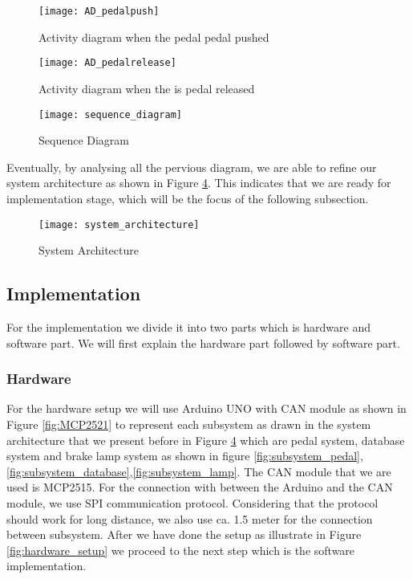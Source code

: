 \begin{figure}[h]
    \centering
    \texttt{[image: AD\_pedalpush]}
    \caption{Activity diagram when the pedal pedal pushed}
    \label{fig:fig:AD_pedalpush}
\end{figure}
\begin{figure}[h]
    \centering
    \texttt{[image: AD\_pedalrelease]}
    \caption{Activity diagram when the is pedal released}
    \label{fig:AD_pedalrelease}
\end{figure}


\begin{figure}[h]
    \centering
    \texttt{[image: sequence\_diagram]}
    \caption{Sequence Diagram}
    \label{fig:sequence_diagram}
\end{figure}

Eventually, by analysing all the pervious diagram,  we are able to refine our system architecture as shown in Figure \ref{fig:system_architecture}.  This indicates that we are ready for implementation stage, which will be the focus of the following subsection.

\begin{figure}[h]
    \centering
    \texttt{[image: system\_architecture]}
    \caption{System Architecture}
    \label{fig:system_architecture}
\end{figure}

\subsection{Implementation}
For the implementation we divide it into two parts which is hardware and software part. We will first explain the hardware part followed by software part.

\subsubsection{Hardware}

For the hardware setup we will use Arduino UNO with CAN module as shown in Figure \ref{fig:MCP2521} to represent each subsystem as drawn in the system architecture that we present before in Figure \ref{fig:system_architecture} which are pedal system, database system and brake lamp system as shown in figure \ref{fig:subsystem_pedal}, \ref{fig:subsystem_database},\ref{fig:subsystem_lamp}. The CAN module that we are used is MCP2515. For the connection with between the Arduino and the CAN module, we use SPI communication protocol. Considering that the protocol should work for long distance, we also use ca. 1.5 meter for the connection between subsystem. After we have done the setup as illustrate in Figure \ref{fig:hardware_setup} we proceed to the next step which is the software implementation.


